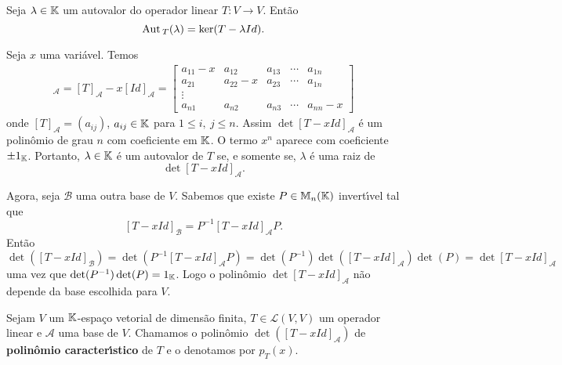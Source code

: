 \begin{proposicao}
	Seja $\lambda \in \mathbb{K}$ um autovalor do operador linear $T : V \to V$. Ent\~ao
	\[
		{\rm Aut\,}_T(\lambda) = \ker(T - \lambda Id).
	\]
\end{proposicao}

Seja $x$ uma vari\'avel. Temos
\begin{align}
	[T - xId]_\mathcal{A} = [T]_\mathcal{A} - x[Id]_\mathcal{A} = \begin{bmatrix}
		a_{11} - x & a_{12} & a_{13} & \cdots & a_{1n}\\
		a_{21} & a_{22} - x & a_{23} & \cdots & a_{1n}\\
		\vdots\\
		a_{n1} & a_{n2} & a_{n3} & \cdots & a_{nn} - x
	\end{bmatrix}
\end{align}
onde $[T]_\mathcal{A} = (a_{ij})$, $a_{ij} \in \mathbb{K}$ para $1 \le i,\ j \le n$. Assim $\det[T - xId]_\mathcal{A}$ \'e um polin\^omio de grau $n$ com coeficiente em $\mathbb{K}$. O termo $x^n$ aparece com coeficiente $\pm 1_{\mathbb{K}}$. Portanto, $\lambda \in \mathbb{K}$ \'e um autovalor de $T$ se, e somente se, $\lambda$ \'e uma raiz de
\[
\det[T - xId]_\mathcal{A}.
\]

Agora, seja $\mathcal{B}$ uma outra base de $V$. Sabemos que existe $P \in \mathbb{M}_n(\mathbb{K})$ invert{\'\i}vel tal que
\[
[T - xId]_\mathcal{B} = P^{-1}[T - xId]_\mathcal{A}P.
\]
Ent\~ao
\[
	\det([T - xId]_\mathcal{B}) = \det(P^{-1}[T - xId]_\mathcal{A}P) = \det(P^{-1})\det([T - xId]_\mathcal{A})\det(P) = \det[T - xId]_\mathcal{A}
\]
uma vez que $\det(P^{-1})\det(P) = 1_{\mathbb{K}}$. Logo o polin\^omio $\det[T - xId]_\mathcal{A}$ n\~ao depende da base escolhida para $V$.

\begin{definicao}
	Sejam $V$ um $\mathbb{K}$-espa\c{c}o vetorial de dimens\~ao finita, $T \in \mathcal{L}(V,V)$ um operador linear e $\mathcal{A}$ uma base de $V$. Chamamos o polin\^omio $\det([T - xId]_\mathcal{A})$ de \textbf{polin\^omio caracter{\'\i}stico} de $T$ e o denotamos por $p_T(x)$.
\end{definicao}

